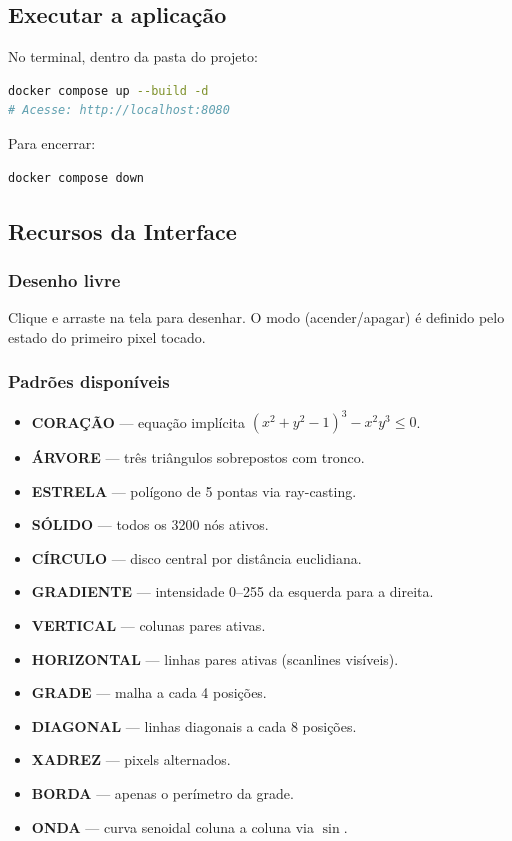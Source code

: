\documentclass[12pt, a4paper]{article}
\begin{document}
\subsection{Executar a aplicação}
No terminal, dentro da pasta do projeto:

\begin{lstlisting}[language=bash]
docker compose up --build -d
# Acesse: http://localhost:8080
\end{lstlisting}

Para encerrar:

\begin{lstlisting}[language=bash]
docker compose down
\end{lstlisting}

\subsection{Recursos da Interface}

\subsubsection{Desenho livre}
Clique e arraste na tela para desenhar. O modo (acender/apagar) é definido pelo estado do primeiro pixel tocado.

\subsubsection{Padrões disponíveis}
\begin{itemize}
    \item \textbf{CORAÇÃO} — equação implícita $(x^2+y^2-1)^3 - x^2y^3 \leq 0$.
    \item \textbf{ÁRVORE} — três triângulos sobrepostos com tronco.
    \item \textbf{ESTRELA} — polígono de 5 pontas via ray-casting.
    \item \textbf{SÓLIDO} — todos os 3200 nós ativos.
    \item \textbf{CÍRCULO} — disco central por distância euclidiana.
    \item \textbf{GRADIENTE} — intensidade 0–255 da esquerda para a direita.
    \item \textbf{VERTICAL} — colunas pares ativas.
    \item \textbf{HORIZONTAL} — linhas pares ativas (scanlines visíveis).
    \item \textbf{GRADE} — malha a cada 4 posições.
    \item \textbf{DIAGONAL} — linhas diagonais a cada 8 posições.
    \item \textbf{XADREZ} — pixels alternados.
    \item \textbf{BORDA} — apenas o perímetro da grade.
    \item \textbf{ONDA} — curva senoidal coluna a coluna via $\sin$.
\end{itemize}
\end{document}
